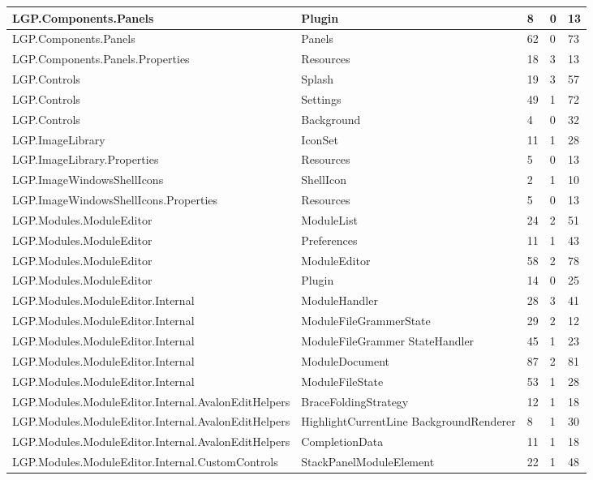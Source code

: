 \begin{table}[h!t]
{\begin{tabular}{ | p{82mm} | p{32mm} | p{10mm} | p{10mm} | p{10mm} | }
				LGP.Components.Panels & Plugin & 8     & 0     & 13  \\ \hline
				LGP.Components.Panels & Panels & \cellcolor{ored}62    & 0     & \cellcolor{ored}73  \\ \hline
				LGP.Components.Panels.Properties & Resources & 18    & 3     & 13  \\ \hline
				LGP.Controls & Splash & 19    & 3     & \cellcolor{ored}57  \\ \hline
				LGP.Controls & Settings & \cellcolor{ored}49    & 1     & \cellcolor{ored}72  \\ \hline
				LGP.Controls & Background & 4     & 0     & 32  \\ \hline
				LGP.ImageLibrary & IconSet & 11    & 1     & 28  \\ \hline
				LGP.ImageLibrary.Properties & Resources & 5     & 0     & 13  \\ \hline
				LGP.ImageWindowsShellIcons & ShellIcon & 2     & 1     & 10  \\ \hline
				LGP.ImageWindowsShellIcons.Properties & Resources & 5     & 0     & 13  \\ \hline
				LGP.Modules.ModuleEditor & ModuleList & 24    & 2     & \cellcolor{ored}51  \\ \hline
				LGP.Modules.ModuleEditor & Preferences & 11    & 1     & 43  \\ \hline
				LGP.Modules.ModuleEditor & ModuleEditor & \cellcolor{ored}58    & 2     & \cellcolor{ored}78  \\ \hline
				LGP.Modules.ModuleEditor & Plugin & 14    & 0     & 25  \\ \hline
				LGP.Modules.ModuleEditor.Internal & ModuleHandler & 28    & 3     & 41  \\ \hline
				LGP.Modules.ModuleEditor.Internal & ModuleFileGrammerState & 29    & 2     & 12  \\ \hline
				LGP.Modules.ModuleEditor.Internal & ModuleFileGrammer\newline
													StateHandler & \cellcolor{ored}45    & 1     & 23  \\ \hline
				LGP.Modules.ModuleEditor.Internal & ModuleDocument & \cellcolor{ored}87    & 2     & \cellcolor{ored}81  \\ \hline
				LGP.Modules.ModuleEditor.Internal & ModuleFileState & \cellcolor{ored}53    & 1     & 28  \\ \hline
				LGP.Modules.ModuleEditor.Internal.AvalonEditHelpers & BraceFoldingStrategy & 12    & 1     & 18  \\ \hline
				LGP.Modules.ModuleEditor.Internal.AvalonEditHelpers & HighlightCurrentLine\newline
																	  BackgroundRenderer & 8     & 1     & 30  \\ \hline
				LGP.Modules.ModuleEditor.Internal.AvalonEditHelpers & CompletionData & 11    & 1     & 18  \\ \hline
				LGP.Modules.ModuleEditor.Internal.CustomControls & StackPanelModuleElement & 22    & 1     & \cellcolor{ored}48  \\ \hline
				\end{tabular}}
				

\end{table}
